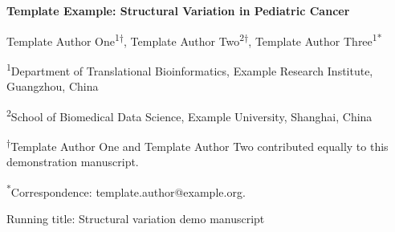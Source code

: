 {
\thispagestyle{fancy}
\begin{center}
{\bfseries\fontsize{15.12}{20}\selectfont Template Example: Structural Variation in Pediatric Cancer\par}
\vspace{1.2\baselineskip}
Template Author One\textsuperscript{1}\textsuperscript{†}, Template Author Two\textsuperscript{2}\textsuperscript{†}, Template Author Three\textsuperscript{1}\textsuperscript{*}\par
\end{center}

\sloppy
\noindent\textsuperscript{1}Department of Translational Bioinformatics, Example Research Institute, Guangzhou, China\par
\noindent\textsuperscript{2}School of Biomedical Data Science, Example University, Shanghai, China\par
\noindent\textsuperscript{†}Template Author One and Template Author Two contributed equally to this demonstration manuscript.\par
\noindent\textsuperscript{*}Correspondence: template.author@example.org.\par
\noindent Running title: Structural variation demo manuscript\par
\fussy
}
